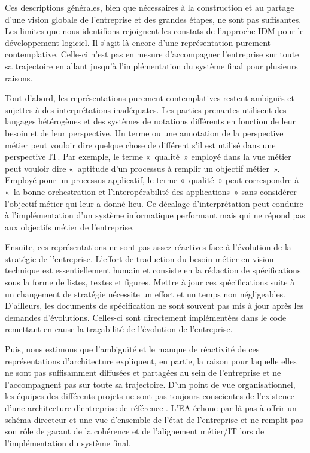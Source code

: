  Ces descriptions générales, bien que nécessaires à la construction et au
partage d'une vision globale de l'entreprise et des grandes étapes, ne sont pas
suffisantes. Les limites que nous identifions rejoignent les constats de
l'approche IDM pour le développement logiciel. Il s'agit là encore d'une
représentation purement contemplative. Celle-ci n'est pas en mesure
d'accompagner l'entreprise sur toute sa trajectoire en allant jusqu'à
l'implémentation du système final pour plusieurs raisons.

 Tout d'abord, les représentations purement contemplatives restent ambiguës
et sujettes à des interprétations inadéquates. Les parties prenantes utilisent
des langages hétérogènes et des systèmes de notations différents en fonction de
leur besoin et de leur perspective. Un terme ou une annotation de la
perspective métier peut vouloir dire quelque chose de différent s'il est
utilisé dans une perspective IT. Par exemple, le terme «~qualité~» employé dans
la vue métier peut vouloir dire «~aptitude d'un processus à remplir un objectif
métier~». Employé pour un processus applicatif, le terme «~qualité~» peut
correspondre à «~la bonne orchestration et l'interopérabilité des
applications~» sans considérer l'objectif métier qui leur a donné lieu. Ce
décalage d'interprétation peut conduire à l'implémentation d'un système
informatique performant mais qui ne répond pas aux objectifs métier de
l'entreprise.

Ensuite, ces représentations ne sont pas assez réactives face à l'évolution
de la stratégie de l'entreprise. L'effort de traduction du besoin métier en
vision technique est essentiellement humain et consiste en la rédaction de
spécifications sous la forme de listes, textes et figures. Mettre à jour ces
spécifications suite à un changement de stratégie nécessite un effort et un
temps non négligeables. D'ailleurs, les documents de spécification ne sont
souvent pas mis à jour après les demandes d'évolutions. Celles-ci sont
directement implémentées dans le code remettant en cause la traçabilité de
l'évolution de l'entreprise.

Puis, nous estimons que l'ambiguïté et le manque de réactivité de ces
représentations d'architecture expliquent, en partie, la raison pour laquelle
elles ne sont pas suffisamment diffusées et partagées au sein de l'entreprise
et ne l'accompagnent pas sur toute sa trajectoire. D'un point de vue
organisationnel, les équipes des différents projets ne sont pas toujours
conscientes de l'existence d'une architecture d'entreprise de référence
\cite{shah2007frameworks}. L'EA échoue par là pas à offrir un schéma directeur
et une vue d'ensemble de l'état de l'entreprise et ne remplit pas son rôle de
garant de la cohérence et de l'alignement métier/IT lors de l'implémentation du
système final.

